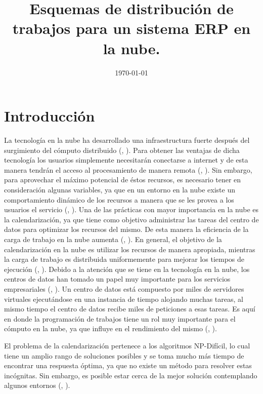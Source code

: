 \documentclass[jou,apacite]{apa6}
\title{Esquemas de distribución de trabajos para un sistema ERP en la nube.}
\date{\small{\today}}
\begin{document}
\maketitle    
                        
\section{Introducción}

La tecnolog\'ia en la nube ha desarrollado una infraestructura fuerte despu\'es del surgimiento del c\'omputo distribuido (\citeauthor{chen2009cloud}, \citeyear{chen2009cloud}). Para obtener las ventajas de dicha tecnolog\'ia los usuarios simplemente necesitar\'an conectarse a internet y de esta manera tendr\'an el acceso al procesamiento de manera remota (\citeauthor{aranganathan2011aco}, \citeyear{aranganathan2011aco}). Sin embargo, para aprovechar el m\'aximo potencial de \'estos recursos, es necesario tener en consideraci\'on algunas variables, ya que en un entorno en la nube existe un comportamiento din\'amico de los recursos a manera que se les provea a los usuarios el servicio (\citeauthor{shimpy2014different}, \citeyear{shimpy2014different}).
Una de las pr\'acticas con mayor importancia en la nube es la calendarizaci\'on, ya que tiene como objetivo administrar las tareas del centro de datos para optimizar los recursos del mismo. De esta manera la eficiencia de la carga de trabajo en la nube aumenta (\citeauthor{shimpy2014different}, \citeyear{shimpy2014different}).
En general, el objetivo de la calendarizaci\'on en la nube es utilizar los recursos de manera apropiada, mientras la carga de trabajo es distribuida uniformemente para mejorar los tiempos de ejecuci\'on (\citeauthor{shimpy2014different}, \citeyear{shimpy2014different}).
Debido a la atenci\'on que se tiene en la tecnolog\'ia en la nube, los centros de datos han tomado un papel muy importante para los servicios empresariales (\citeauthor{shimpy2014different}, \citeyear{shimpy2014different}). 
Un centro de datos est\'a compuesto por miles de servidores virtuales ejecut\'andose en una instancia de tiempo alojando muchas tareas, al mismo tiempo el centro de datos recibe miles de peticiones a esas tareas. Es aqu\'i en donde la programaci\'on de trabajos tiene un rol muy importante para el c\'omputo en la nube, ya que influye en el rendimiento del mismo (\citeauthor{srinivasan2014cloud}, \citeyear{srinivasan2014cloud}). 

El problema de la calendarizaci\'on pertenece a los algoritmos NP-Dif\'icil, lo cual tiene un amplio rango de soluciones posibles y se toma mucho m\'as tiempo de encontrar una respuesta \'optima, ya que no existe un m\'etodo para resolver estas inc\'ognitas. Sin embargo, es posible estar cerca de la mejor soluci\'on contemplando algunos entornos (\citeauthor{shimpy2014different}, \citeyear{shimpy2014different}).
\end{document}
